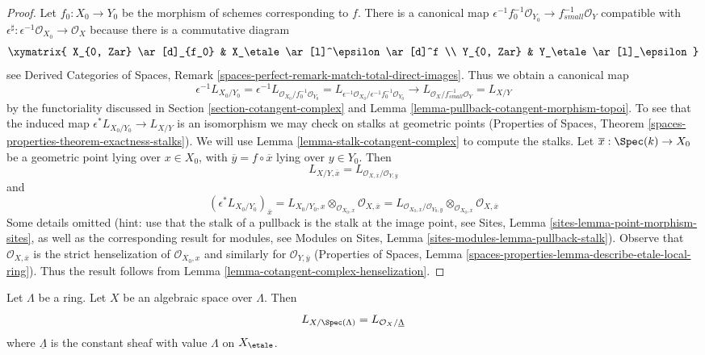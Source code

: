 \begin{proof}
Let $f_0 : X_0 \to Y_0$ be the morphism of schemes corresponding to $f$.
There is a canonical map
$\epsilon^{-1}f_0^{-1}\mathcal{O}_{Y_0} \to f_{small}^{-1}\mathcal{O}_Y$
compatible with
$\epsilon^\sharp : \epsilon^{-1}\mathcal{O}_{X_0} \to \mathcal{O}_X$
because there is a commutative diagram
$$
\xymatrix{
X_{0, Zar} \ar[d]_{f_0} & X_\etale \ar[l]^\epsilon \ar[d]^f \\
Y_{0, Zar} & Y_\etale \ar[l]_\epsilon
}
$$
see Derived Categories of Spaces, Remark
\ref{spaces-perfect-remark-match-total-direct-images}.
Thus we obtain a canonical map
$$
\epsilon^{-1}L_{X_0/Y_0} =
\epsilon^{-1}L_{\mathcal{O}_{X_0}/f_0^{-1}\mathcal{O}_{Y_0}} =
L_{\epsilon^{-1}\mathcal{O}_{X_0}/\epsilon^{-1}f_0^{-1}\mathcal{O}_{Y_0}}
\longrightarrow
L_{\mathcal{O}_X/f^{-1}_{small}\mathcal{O}_Y} = L_{X/Y}
$$
by the functoriality discussed in Section \ref{section-cotangent-complex}
and Lemma \ref{lemma-pullback-cotangent-morphism-topoi}.
To see that the induced map $\epsilon^*L_{X_0/Y_0} \to L_{X/Y}$ is an
isomorphism we may check on stalks at geometric points
(Properties of Spaces, Theorem
\ref{spaces-properties-theorem-exactness-stalks}).
We will use Lemma \ref{lemma-stalk-cotangent-complex}
to compute the stalks. Let $\overline{x} : \Spec(k) \to X_0$
be a geometric point lying over $x \in X_0$, with
$\overline{y} = f \circ \overline{x}$ lying over $y \in Y_0$. Then
$$
L_{X/Y, \overline{x}} =
L_{\mathcal{O}_{X, \overline{x}}/\mathcal{O}_{Y, \overline{y}}}
$$
and
$$
(\epsilon^*L_{X_0/Y_0})_{\overline{x}} =
L_{X_0/Y_0, x} \otimes_{\mathcal{O}_{X_0, x}}
\mathcal{O}_{X, \overline{x}} =
L_{\mathcal{O}_{X_0, x}/\mathcal{O}_{Y_0, y}}
\otimes_{\mathcal{O}_{X_0, x}} \mathcal{O}_{X, \overline{x}}
$$
Some details omitted (hint: use that the stalk of a pullback
is the stalk at the image point, see
Sites, Lemma \ref{sites-lemma-point-morphism-sites},
as well as the corresponding result for modules, see
Modules on Sites, Lemma \ref{sites-modules-lemma-pullback-stalk}).
Observe that $\mathcal{O}_{X, \overline{x}}$ is the strict
henselization of $\mathcal{O}_{X_0, x}$ and similarly
for $\mathcal{O}_{Y, \overline{y}}$
(Properties of Spaces, Lemma
\ref{spaces-properties-lemma-describe-etale-local-ring}).
Thus the result follows from
Lemma \ref{lemma-cotangent-complex-henselization}.
\end{proof}

\begin{lemma}
\label{lemma-space-over-ring}
Let $\Lambda$ be a ring. Let $X$ be an algebraic space over $\Lambda$.
Then
$$
L_{X/\Spec(\Lambda)} = L_{\mathcal{O}_X/\underline{\Lambda}}
$$
where $\underline{\Lambda}$ is the constant sheaf with value
$\Lambda$ on $X_\etale$.
\end{lemma}

